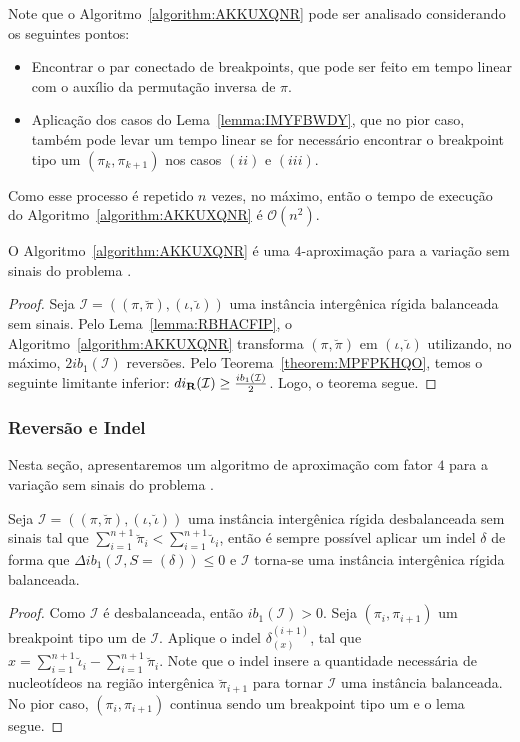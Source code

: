 Note que o Algoritmo~\ref{algorithm:AKKUXQNR} pode ser analisado considerando os seguintes pontos: 
\begin{itemize}
  \item Encontrar o par conectado de breakpoints, que pode ser feito em tempo linear com o auxílio da permutação inversa de $\pi$.
  \item Aplicação dos casos do Lema~\ref{lemma:IMYFBWDY}, que no pior caso, também pode levar um tempo linear se for necessário encontrar o breakpoint tipo um $(\pi_k,\pi_{k+1})$ nos casos $(ii)$ e $(iii)$. 
\end{itemize}

Como esse processo é repetido $n$ vezes, no máximo, então o tempo de execução do Algoritmo~\ref{algorithm:AKKUXQNR} é $\mathcal{O}(n^2)$.

\begin{theorem}\label{theorem:BLJAGNDZ}
O Algoritmo~\ref{algorithm:AKKUXQNR} é uma $4$-aproximação para a variação sem sinais do problema \SbIR{}.
\end{theorem}
\begin{proof}
Seja $\mathcal{I}=((\pi,\breve\pi),(\iota,\breve\iota))$ uma instância intergênica rígida balanceada sem sinais. Pelo Lema~\ref{lemma:RBHACFIP}, o Algoritmo~\ref{algorithm:AKKUXQNR} transforma $(\pi,\breve\pi)$ em $(\iota,\breve\iota)$ utilizando, no máximo, $2ib_1(\mathcal{I})$ reversões. Pelo Teorema~\ref{theorem:MPFPKHQO}, temos o seguinte limitante inferior: $di_{\textbf{R}}(\mathcal{I}) \ge \frac{ib_1(\mathcal{I})}{2}$. Logo, o teorema segue. 
\end{proof}

\subsubsection{Reversão e Indel}

Nesta seção, apresentaremos um algoritmo de aproximação com fator $4$ para a variação sem sinais do problema \SbIRI{}.

\begin{lemma}\label{lemma:QGOIQLZD}
Seja $\mathcal{I}=((\pi,\breve\pi),(\iota,\breve\iota))$ uma instância intergênica rígida desbalanceada sem sinais tal que $\sum_{i=1}^{n+1}\breve\pi_i < \sum_{i=1}^{n+1}\breve\iota_i$, então é sempre possível aplicar um indel $\delta$ de forma que $\Delta ib_1(\mathcal{I}, S=(\delta)) \le 0$ e $\mathcal{I}$ torna-se uma instância intergênica rígida balanceada.
\end{lemma}
\begin{proof}
Como $\mathcal{I}$ é desbalanceada, então $ib_1(\mathcal{I}) > 0$. Seja $(\pi_i,\pi_{i+1})$ um breakpoint tipo um de $\mathcal{I}$. Aplique o indel $\delta_{(x)}^{(i+1)}$, tal que $x = \sum_{i=1}^{n+1}\breve\iota_i - \sum_{i=1}^{n+1}\breve\pi_i$. Note que o indel insere a quantidade necessária de nucleotídeos na região intergênica $\breve\pi_{i+1}$ para tornar $\mathcal{I}$ uma instância balanceada. No pior caso, $(\pi_i,\pi_{i+1})$ continua sendo um breakpoint tipo um e o lema segue.
\end{proof}

